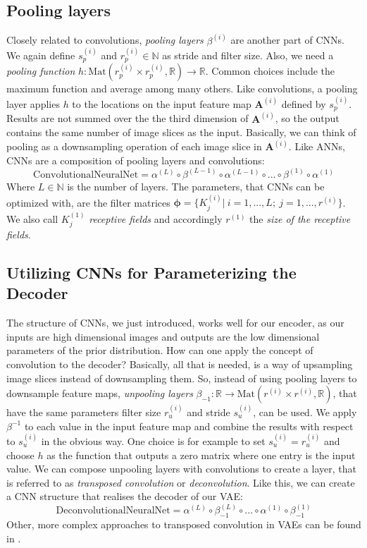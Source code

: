 \documentclass[12pt]{report}
\theoremstyle{definition}
\begin{document}
\subsection{Pooling layers}
Closely related to convolutions, \emph{pooling layers} $\beta^{(i)}$ are another part of CNNs. We again define $s_p^{(i)}$ and $r_p^{(i)}\in \mathbb{N}$ as stride and filter size. Also, we need a \emph{pooling function} $h: \mathrm{Mat}(r_p^{(i)} \times r_p^{(i)}, \mathbb{R}) \rightarrow \mathbb{R}$. Common choices include the maximum function and average among many others. Like convolutions, a pooling layer applies $h$ to the locations on the input feature map $\mathbf{A}^{(i)}$ defined by $s_p^{(i)}$. Results are not summed over the the third dimension of $\mathbf{A}^{(i)}$, so the output contains the same number of image slices as the input. Basically, we can think of pooling as a downsampling operation of each image slice in $\mathbf{A}^{(i)}$.
Like ANNs, CNNs are a composition of pooling layers and convolutions:
\begin{equation}
\mathrm{ConvolutionalNeuralNet} = \alpha^{(L)} \circ \beta^{(L-1)} \circ \alpha^{(L-1)} \circ ... \circ \beta^{(1)} \circ \alpha^{(1)}
\end{equation}
Where $L \in \mathbb{N}$ is the number of layers. The parameters, that CNNs can be optimized with, are the filter matrices $\pmb{\phi} = \{ K^{(i)}_j | \ i=1, ..., L; \ j=1, ..., r^{(i)} \}$. We also call $K^{(1)}_j$ \emph{receptive fields} and accordingly $r^{(1)}$ the \emph{size of the receptive fields}.

\subsection{Utilizing CNNs for Parameterizing the Decoder}
The structure of CNNs, we just introduced, works well for our encoder, as our inputs are high dimensional images and outputs are the low dimensional parameters of the prior distribution. How can one apply the concept of convolution to the decoder?
Basically, all that is needed, is a way of upsampling image slices instead of downsampling them. So, instead of using pooling layers to downsample feature maps, \emph{unpooling layers} $\beta_{-1}: \mathbb{R} \rightarrow \mathrm{Mat}(r^{(i)} \times r^{(i)}, \mathbb{R})$, that have the same parameters filter size $r_u^{(i)}$ and stride $s_u^{(i)}$, can be used. We apply $\beta^{-1}$ to each value in the input feature map and combine the results with respect to $s_u^{(i)}$ in the obvious way. One choice is for example to set $s_u^{(i)} = r_u^{(i)}$ and choose $h$ as the function that outputs a zero matrix where one entry is the input value. We can compose unpooling layers with convolutions to create a layer, that is referred to as \emph{transposed convolution} or \emph{deconvolution}. Like this, we can create a CNN structure that realises the decoder of our VAE:
\begin{equation}
\mathrm{DeconvolutionalNeuralNet} = \alpha^{(L)} \circ \beta^{(L)}_{-1} \circ ... \circ \alpha^{(1)} \circ \beta_{-1}^{(1)}
\end{equation}
Other, more complex approaches to transposed convolution in VAEs can be found in \cite{cvae}.
\end{document}
